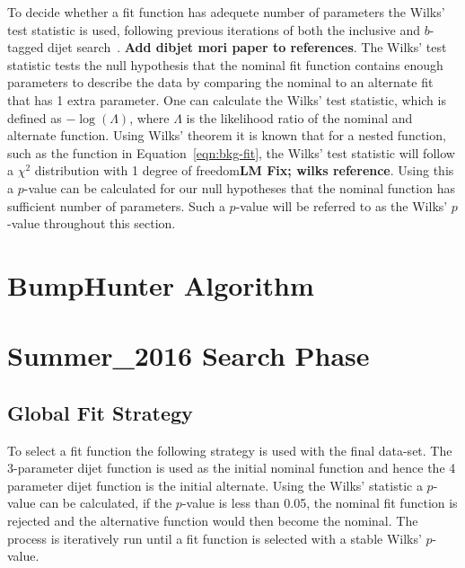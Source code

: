 To decide whether a fit function has adequete number of parameters the Wilks' test statistic is used,
following previous iterations of both the inclusive and $b$-tagged dijet search~\cite{dijet-mori16_paper,dibjet-mori16_paper}.
\textbf{Add dibjet mori paper to references}.
The Wilks' test statistic tests the null hypothesis that the nominal fit function contains enough parameters to describe the data
by comparing the nominal to an alternate fit that has 1 extra parameter.
One can calculate the Wilks' test statistic, which is defined as $-\log{(\Lambda)}$, where $\Lambda$ is the likelihood ratio of the nominal and alternate function.
Using Wilks' theorem it is known that for a nested function, such as the function in Equation~\ref{eqn:bkg-fit},
the Wilks' test statistic will follow a $\chi^2$ distribution with 1 degree of freedom\textbf{LM Fix; wilks reference}.
Using this a $p$-value can be calculated for our null hypotheses that the nominal function has sufficient number of parameters.
Such a $p$-value will be referred to as the Wilks' $p$-value throughout this section.


\section{BumpHunter Algorithm}
\label{sec:bkg-bh}

\section{Summer\_2016 Search Phase}
\label{sec:bkg-summer}

\subsection{Global Fit Strategy}
\label{sec:bkg-summer_global}

To select a fit function the following strategy is used with the final data-set.
The 3-parameter dijet function is used as the initial nominal function and hence the 4 parameter dijet function is the initial alternate.
Using the Wilks' statistic a $p$-value can be calculated,
if the $p$-value is less than 0.05, the nominal fit function is rejected and the alternative function would then become the nominal.
The process is iteratively run until a fit function is selected with a stable Wilks' $p$-value.

